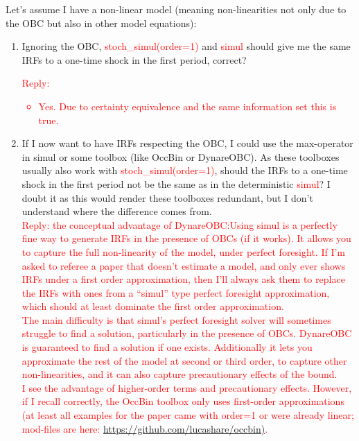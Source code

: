 \documentclass[cn,10pt,math=newtx,citestyle=gb7714-2015,bibstyle=gb7714-2015]{elegantbook}
\begin{document}
{{	Let’s assume I have a non-linear model (meaning non-linearities not only due to the OBC but also in other model equations):\\
	\begin{enumerate}
		\item  Ignoring the OBC, \textcolor{red}{stoch\_simul(order=1)} and \textcolor{red}{simul} should give me the same IRFs to a one-time shock in the first period, correct?\\
		\textcolor{red}{Reply:
			\begin{itemize}
				\item Yes. Due to certainty equivalence and the same information set this is true.
			\end{itemize}
		}
		\item If I now want to have IRFs respecting the OBC, I could use the max-operator in simul or some toolbox (like OccBin or DynareOBC). As these toolboxes usually also work with \textcolor{red}{stoch\_simul(order=1)}, should the IRFs to a one-time shock in the first period not be the same as in the deterministic \textcolor{red}{simul}? I doubt it as this would render these toolboxes redundant, but I don’t understand where the difference comes from.\\
		\textcolor{red}{Reply: the conceptual advantage of DynareOBC:Using simul is a perfectly fine way to generate IRFs in the presence of OBCs (if it works). It allows you to capture the full non-linearity of the model, under perfect foresight. If I’m asked to referee a paper that doesn’t estimate a model, and only ever shows IRFs under a first order approximation, then I’ll always ask them to replace the IRFs with ones from a “simul” type perfect foresight approximation, which should at least dominate the first order approximation.\\
			The main difficulty is that simul’s perfect foresight solver will sometimes struggle to find a solution, particularly in the presence of OBCs. DynareOBC is guaranteed to find a solution if one exists. Additionally it lets you approximate the rest of the model at second or third order, to capture other non-linearities, and it can also capture precautionary effects of the bound.\\
			I see the advantage of higher-order terms and precautionary effects. However, if I recall correctly, the OccBin toolbox only uses first-order approximations (at least all examples for the paper came with order=1 or were already linear; mod-files are here: \url{https://github.com/lucashare/occbin)}.\\
}
\end{enumerate}}}
\end{document}
